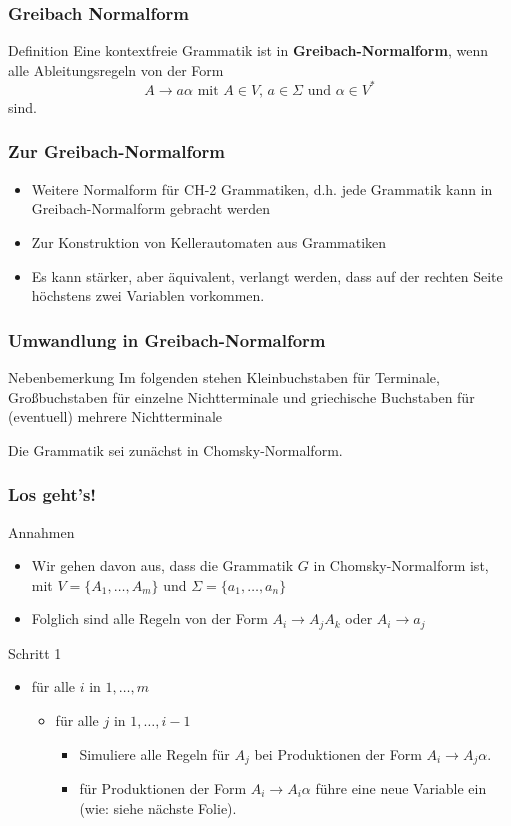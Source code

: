 \begin{frame}
\frametitle{Greibach Normalform}
\begin{exampleblock}{Definition}
Eine kontextfreie Grammatik ist in \textbf{Greibach-Normalform}, wenn alle Ableitungsregeln von der Form 
$$ A \rightarrow a\alpha \text{ mit } A \in V\text{, } a\in \Sigma \text{ und } \alpha \in V^*$$
sind.
\end{exampleblock}
\end{frame}

\begin{frame}
\frametitle{Zur Greibach-Normalform}
\begin{itemize}
\item Weitere Normalform für CH-2 Grammatiken, d.h. jede Grammatik kann in Greibach-Normalform gebracht werden
\item Zur Konstruktion von Kellerautomaten aus Grammatiken
\item Es kann stärker, aber äquivalent, verlangt werden, dass auf der rechten Seite höchstens zwei Variablen vorkommen.
\end{itemize}
\end{frame}

\begin{frame}
\frametitle{Umwandlung in Greibach-Normalform}
\begin{exampleblock}{Nebenbemerkung}
Im folgenden stehen Kleinbuchstaben für Terminale, Großbuchstaben für einzelne Nichtterminale und griechische Buchstaben für (eventuell) mehrere Nichtterminale 
\end{exampleblock}
Die Grammatik sei zunächst in Chomsky-Normalform.
\end{frame}

\begin{frame}
\frametitle{Los geht's!}
\begin{block}{Annahmen}
\begin{itemize}
 \item Wir gehen davon aus, dass die Grammatik $G$ in Chomsky-Normalform ist, mit $V = \{A_1, \ldots, A_m \}$ und $\Sigma = \{a_1, \ldots, a_n\}$
 \item Folglich sind alle Regeln von der Form $A_i \rightarrow A_jA_k$ oder $A_i \rightarrow a_j$
\end{itemize}
\end{block}
\begin{block}{Schritt 1}
\begin{itemize}
\item für alle $i$ in $1, \ldots, m$
\begin{itemize}
\item für alle $j$ in $1, \ldots, i-1$
\begin{itemize}
\item Simuliere alle Regeln für $A_j$ bei Produktionen der Form $A_i \rightarrow A_j\alpha$.
\item für Produktionen der Form $A_i \rightarrow A_i\alpha$ führe eine neue Variable ein (wie: siehe nächste Folie).
\end{itemize}
\end{itemize}
\end{itemize}
\end{block}
\end{frame}

